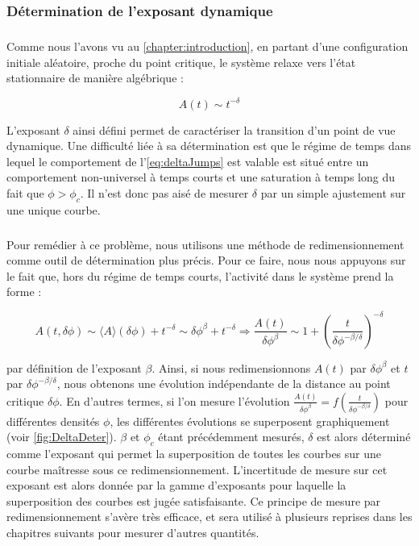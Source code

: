 \subsubsection{Détermination de l'exposant dynamique}

\subparagraph{}Comme nous l'avons vu au \autoref{chapter:introduction}, en partant d'une configuration initiale aléatoire, proche du point critique, le système relaxe vers l'état stationnaire de manière algébrique :

\begin{equation}
	A(t) \sim t^{-\delta}
	\label{eq:deltaJumps}
\end{equation}

\noindent L'exposant $\delta$ ainsi défini permet de caractériser la transition d'un point de vue dynamique. Une difficulté liée à sa détermination est que le régime de temps dans lequel le comportement de l'\autoref{eq:deltaJumps} est valable est situé entre un comportement non-universel à temps courts et une saturation à temps long du fait que $\phi>\phi_c$. Il n'est donc pas aisé de mesurer $\delta$ par un simple ajustement sur une unique courbe. 

\subparagraph{}Pour remédier à ce problème, nous utilisons une méthode de redimensionnement comme outil de détermination plus précis. Pour ce faire, nous nous appuyons sur le fait que, hors du régime de temps courts, l'activité dans le système prend la forme :

\begin{equation}
	A(t, \delta\phi) \sim \langle A \rangle (\delta\phi) + t^{-\delta} \sim \delta\phi^\beta + t^{-\delta} \Rightarrow \frac{A(t)}{\delta\phi^\beta} \sim 1 + \left(\frac{t}{\delta\phi^{-\beta/\delta}}\right)^{-\delta}
\end{equation}

\noindent par définition de l'exposant $\beta$. Ainsi, si nous redimensionnons $A(t)$ par $\delta\phi^\beta$ et $t$ par $\delta\phi^{-\beta/\delta}$, nous obtenons une évolution indépendante de la distance au point critique $\delta\phi$. En d'autres termes, si l'on mesure l'évolution $\frac{A(t)}{\delta\phi^\beta} = f \left(\frac{t}{\delta\phi^{-\beta/\delta}} \right)$ pour différentes densités $\phi$, les différentes évolutions se superposent graphiquement (voir \autoref{fig:DeltaDeter}). $\beta$ et $\phi_c$ étant précédemment mesurés, $\delta$ est alors déterminé comme l'exposant qui permet la superposition de toutes les courbes sur une courbe maîtresse sous ce redimensionnement. L'incertitude de mesure sur cet exposant est alors donnée par la gamme d'exposants pour laquelle la superposition des courbes est jugée satisfaisante. Ce principe de mesure par redimensionnement s'avère très efficace, et sera utilisé à plusieurs reprises dans les chapitres suivants pour mesurer d'autres quantités.

